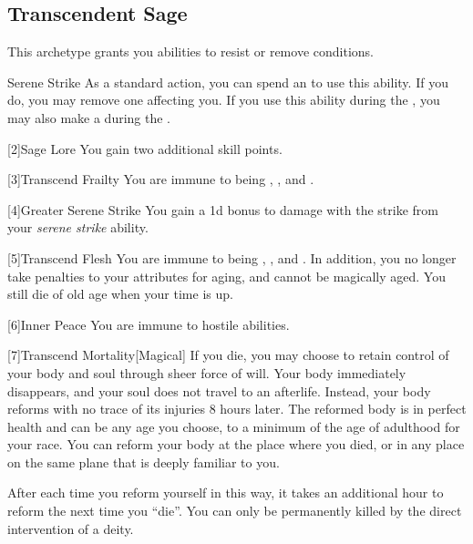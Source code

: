     \subsection{Transcendent Sage}
        This archetype grants you abilities to resist or remove conditions.

        \begin{ability}{Serene Strike}
            As a standard action, you can spend an  to use this ability.
            If you do, you may remove one  affecting you.
            If you use this ability during the , you may also make a  during the .
        \end{ability}

        [2]{Sage Lore} You gain two additional skill points.

        [3]{Transcend Frailty}
        You are immune to being , , and .

        [4]{Greater Serene Strike} You gain a \plus1d bonus to damage with the strike from your \textit{serene strike} ability.

        [5]{Transcend Flesh}
        You are immune to being , , and .
        In addition, you no longer take penalties to your attributes for aging, and cannot be magically aged.
        You still die of old age when your time is up.

        [6]{Inner Peace}
        You are immune to hostile  abilities.

        [7]{Transcend Mortality}[Magical]
        If you die, you may choose to retain control of your body and soul through sheer force of will.
        Your body immediately disappears, and your soul does not travel to an afterlife.
        Instead, your body reforms with no trace of its injuries 8 hours later.
        The reformed body is in perfect health and can be any age you choose, to a minimum of the age of adulthood for your race.
        You can reform your body at the place where you died, or in any place on the same plane that is deeply familiar to you.

        After each time you reform yourself in this way, it takes an additional hour to reform the next time you ``die''.
        You can only be permanently killed by the direct intervention of a deity.

